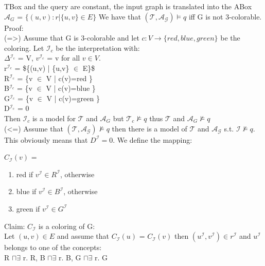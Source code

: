 \documentclass[11pt]{article}
\begin{document}
\begin{enumerate}
\begin{enumerate}
  TBox and the query are constant, the input graph is translated 
  into the ABox $\mathcal{A}_{G}$ = $\{(u,v):r | \{u,v\}\in E\}$
  We have that $(\mathcal{T},\mathcal{A_{G}}) \models q$ 
  iff G is not 3-colorable.
  Proof:\\
     (=>) Assume that G is 3-colorable and let $c:V \to \{red,blue,green\}$
be the coloring. Let $\mathcal{I}_{c}$ be the interpretation with:\\
     $\Delta$$^{\mathcal{I}_{\text{c}}}$ = V, $v^{\mathcal{I}_{c}}$ = v for all $v \in V$. \\
     r$^{\mathcal{I}_{c}}$ = \$\{(u,v) | \{u,v\} $\in$ E\}\$\\
     R$^{\mathcal{I}_{c}}$ = \{v $\in$ V | c(v)=red \}\\
     B$^{\mathcal{I}_{c}}$ = \{v $\in$ V | c(v)=blue \}\\
     G$^{\mathcal{I}_{c}}$ = \{v $\in$ V | c(v)=green \}\\
     D$^{\mathcal{I}_{\text{c}}}$ = 0\\
     Then $\mathcal{I}_{c}$ is a model for $\mathcal{T}$ and $\mathcal{A}_{G}$
but $\mathcal{T}_{c} \not \models q$ thus $\mathcal{T}$ and 
$\mathcal{A}_{G} \not \models q$ \\
     (<=) Assume that $(\mathcal{T},\mathcal{A_{G}}) \not \models q$ then
there is a model of $\mathcal{T}$ and $\mathcal{A_{G}}$ s.t. 
$\mathcal{I} \not \models q$. This obviously means that 
$D^{\mathcal{I}} = 0$. We define the mapping:\\
\begin{center}
$C_{\mathcal{I}}(v)$ = 
\begin{enumerate}
\item red if $v^{\mathcal{I}} \in R^{\mathcal{I}}$, otherwise
\item blue if $v^{\mathcal{I}} \in B^{\mathcal{I}}$, otherwise
\item green if $v^{\mathcal{I}} \in G^{\mathcal{I}}$
\end{enumerate}
\end{center}
Claim: $C_{\mathcal{I}}$ is a coloring of G: \\
     Let $(u,v) \in E$ and assume that $C_{\mathcal{I}}(u)$ = $C_{\mathcal{I}}(v)$ 
then $(u^{\mathcal{I}},v^{\mathcal{I}}) \in r^{\mathcal{I}}$ and 
$u^{\mathcal{I}}$ belongs to one of the concepts: \\
     R $\sqcap \exists$ r. R, B $\sqcap \exists$ r. B, G $\sqcap \exists$ r. G \\


\end{enumerate}
\end{enumerate}
\end{document}
